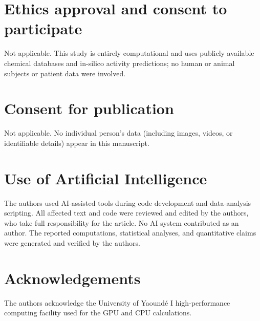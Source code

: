 \documentclass[11pt,a4paper]{article}
\begin{document}
\section*{Ethics approval and consent to participate}

Not applicable. This study is entirely computational and uses publicly available chemical databases and in-silico activity predictions; no human or animal subjects or patient data were involved.

\section*{Consent for publication}

Not applicable. No individual person's data (including images, videos, or identifiable details) appear in this manuscript.

\section*{Use of Artificial Intelligence}

The authors used AI-assisted tools during code development and data-analysis scripting. All affected text and code were reviewed and edited by the authors, who take full responsibility for the article. No AI system contributed as an author. The reported computations, statistical analyses, and quantitative claims were generated and verified by the authors.

\section*{Acknowledgements}

The authors acknowledge the University of Yaoundé I high-performance computing facility used for the GPU and CPU calculations.



\end{document}
